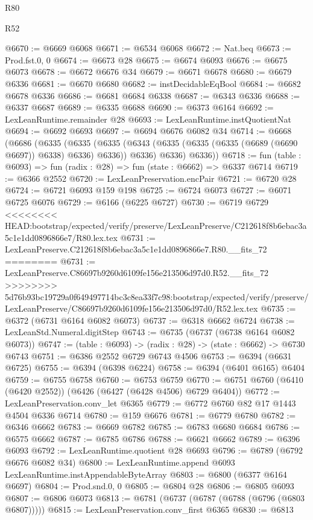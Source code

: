 \begin{lexlean}{R80}
\begin{lexlean}{R52}
\begin{coremodule}
{{{{{{{{{{{{{{{{{{{{{{{{{{{{{{{{{{{{{{{{{{{{{{{{{{{{{{{{{{{{{{{{{{{{{{{{{{{{{{{{{{{{{{{{{{{{{{{{{{{{{{{{{{{{{{{{{{{{{{{{{{{{{{{{{{{{{{{{{{{{{{{{{{{{{{{{{{{{{{{{{{{{{{{{{{{{{{{{{{{{{{{{{{{{{{{{{{{{{{@6670 := @6669 @6068
@6671 := @6534 @6068
@6672 := Nat.beq
@6673 := Prod.fst.{0, 0}
@6674 := @6673 @28
@6675 := @6674 @6093
@6676 := @6675 @6073
@6678 := @6672 @6676 @34
@6679 := @6671 @6678
@6680 := @6679 @6336
@6681 := @6670 @6680
@6682 := instDecidableEqBool
@6684 := @6682 @6678 @6336
@6686 := @6681 @6684 @6338
@6687 := @6343 @6336
@6688 := @6337 @6687
@6689 := @6335 @6688
@6690 := @6373 @6164
@6692 := LexLeanRuntime.remainder @28
@6693 := LexLeanRuntime.instQuotientNat
@6694 := @6692 @6693
@6697 := @6694 @6676 @6082 @34
@6714 := @6668
    (@6686
      (@6335
        (@6335
          (@6335 (@6343 (@6335 (@6335 (@6335 (@6689 (@6690 @6697)) @6338) @6336) @6336)) @6336)
          @6336)
        @6336))
@6718 := fun (table : @6093) => fun (radix : @28) => fun (state : @6662) => @6337 @6714
@6719 := @6366 @2552
@6720 := LexLeanPreservation.encPair
@6721 := @6720 @28
@6724 := @6721 @6093 @159 @198
@6725 := @6724 @6073
@6727 := @6071 @6725 @6076
@6729 := @6166 (@6225 @6727)
@6730 := @6719 @6729
<<<<<<<< HEAD:bootstrap/expected/verify/preserve/LexLeanPreserve/C212618f8b6ebac3a5c1e1dd0896866e7/R80.lex.tex
@6731 := LexLeanPreserve.C212618f8b6ebac3a5c1e1dd0896866e7.R80.__fits_72
========
@6731 := LexLeanPreserve.C86697b9260d6109fe156e213506d97d0.R52.__fits_72
>>>>>>>> 5d76b93bc19729a0f649497714bc3c8ea33f7c98:bootstrap/expected/verify/preserve/LexLeanPreserve/C86697b9260d6109fe156e213506d97d0/R52.lex.tex
@6735 := @6372 (@6731 @6164 @6082 @6073)
@6737 := @6318 @6662 @6724
@6738 := LexLeanStd.Numeral.digitStep
@6743 := @6735 (@6737 (@6738 @6164 @6082 @6073))
@6747 := (table : @6093) -> (radix : @28) -> (state : @6662) -> @6730 @6743
@6751 := @6386 @2552 @6729 @6743 @4506
@6753 := @6394 (@6631 @6725)
@6755 := @6394 (@6398 @6224)
@6758 := @6394 (@6401 @6165) @6404
@6759 := @6755 @6758
@6760 := @6753 @6759
@6770 := @6751 @6760 (@6410 (@6420 @2552)) (@6426 (@6427 (@6428 @4506) @6729 @6404))
@6772 := LexLeanPreservation.conv_let @6365
@6779 := @6772 @6760 @82 @17 @1443 @4504 @6336 @6714
@6780 := @159 @6676
@6781 := @6779 @6780
@6782 := @6346 @6662
@6783 := @6669 @6782
@6785 := @6783 @6680 @6684
@6786 := @6575 @6662
@6787 := @6785 @6786
@6788 := @6621 @6662
@6789 := @6396 @6093
@6792 := LexLeanRuntime.quotient @28 @6693
@6796 := @6789 (@6792 @6676 @6082 @34)
@6800 := LexLeanRuntime.append @6093 LexLeanRuntime.instAppendableByteArray
@6803 := @6800 (@6377 @6164 @6697)
@6804 := Prod.snd.{0, 0}
@6805 := @6804 @28
@6806 := @6805 @6093
@6807 := @6806 @6073
@6813 := @6781 (@6737 (@6787 (@6788 (@6796 (@6803 @6807)))))
@6815 := LexLeanPreservation.conv_first @6365
@6830 := @6813
}}}}}}}}}}}}}}}}}}}}}}}}}}}}}}}}}}}}}}}}}}}}}}}}}}}}}}}}}}}}}}}}}}}}}}}}}}}}}}}}}}}}}}}}}}}}}}}}}}}}}}}}}}}}}}}}}}}}}}}}}}}}}}}}}}}}}}}}}}}}}}}}}}}}}}}}}}}}}}}}}}}}}}}}}}}}}}}}}}}}}}}}}}}}}}}}}}}}}}
\end{coremodule}
\end{lexlean}
\end{lexlean}

